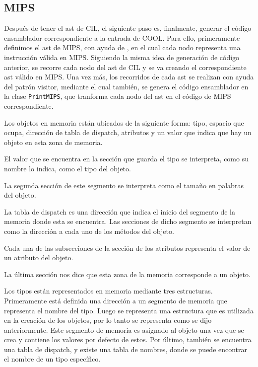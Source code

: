 \documentclass[twoside]{article}
\begin{document}
\subsection{MIPS}
Despu\'es de tener el ast de CIL, el siguiente paso es, finalmente, generar el c\'odigo ensamblador correspondiente a la entrada de COOL. Para ello, primeramente definimos el ast de MIPS, con ayuda de \cite{mips}, en el cual cada nodo representa una instrucci\'on v\'alida en MIPS. Siguiendo la misma idea de generaci\'on de c\'odigo anterior, se recorre cada nodo del ast de CIL y se va creando el correspondiente ast v\'alido en MIPS. Una vez m\'as, los recorridos de cada ast se realizan con ayuda del patr\'on visitor, mediante el cual tambi\'en, se genera el c\'odigo ensamblador en la clase \texttt{PrintMIPS}, que tranforma cada nodo del ast en el c\'odigo de MIPS correspondiente.

Los objetos en memoria est\'an ubicados de la siguiente forma: tipo, espacio que ocupa, direcci\'on de tabla de dispatch, atributos y un valor que indica que hay un objeto en esta zona de memoria. 

El valor que se encuentra en la secci\'on que guarda el tipo se interpreta, como su nombre lo indica, como el tipo del objeto. 

La segunda secci\'on de este segmento se interpreta como el tama\~no en palabras del objeto. 

La tabla de dispatch es una direcci\'on que indica el inicio del segmento de la memoria donde esta se encuentra. Las secciones de dicho segmento se interpretan como la direcci\'on a cada uno de los m\'etodos del objeto. 

Cada una de las subsecciones de la secci\'on de los atributos representa el valor de un atributo del objeto. 

La \'ultima secci\'on nos dice que esta zona de la memoria corresponde a un objeto.

Los tipos est\'an representados en memoria mediante tres estructuras. Primeramente est\'a definida una direcci\'on a un segmento de memoria que representa el nombre del tipo. Luego se representa una estructura que es utilizada en la creaci\'on de los objetos, por lo tanto se representa como se dijo anteriormente. Este segmento de memoria es asignado al objeto una vez que se crea y contiene los valores por defecto de estos. Por \'ultimo, tambi\'en se encuentra una tabla de dispatch, y existe una tabla de nombres, donde se puede encontrar el nombre de un tipo espec\'ifico.
\end{document}
